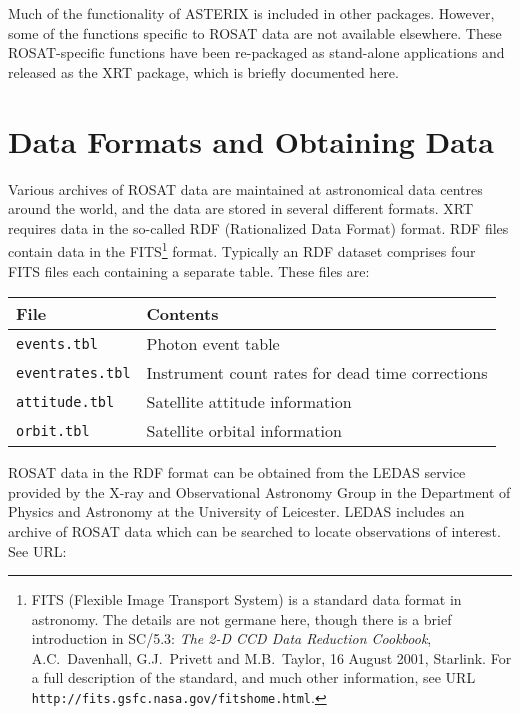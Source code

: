 \documentclass[twoside,11pt]{article}
\newcommand{\htmladdnormallink}[2]{#1}
\newcommand{\xref}[3]{#1}
\newcommand{\xlabel}[1]{}
\renewcommand{\_}{\texttt{\symbol{95}}}
\begin{document}
Much of the functionality of ASTERIX is included in other packages.
However, some of the functions specific to ROSAT data are not available
elsewhere.  These ROSAT-specific functions have been re-packaged as
stand-alone applications and released as the XRT package, which is briefly
documented here.


\section{\xlabel{FORMATS}\label{FORMATS}Data Formats and Obtaining Data}

Various archives of ROSAT data are maintained at astronomical data
centres around the world, and the data are stored in several different
formats.  XRT requires data in the so-called RDF (Rationalized Data 
Format) format.  RDF files contain data in the FITS\footnote{FITS (Flexible
Image Transport System) is a standard data format in astronomy.  The
details are not germane here, though there is a
\xref{brief introduction}{sc5}{FITS} in \xref{SC/5.3}{sc5}{}: {\it The
2-D CCD Data Reduction Cookbook}, A.C.~Davenhall, G.J.~Privett and
M.B.~Taylor, 16 August 2001, Starlink.  For a full description of the
standard, and much other information, see URL
\htmladdnormallink{{\tt http://fits.gsfc.nasa.gov/fits\_home.html}}
{http://fits.gsfc.nasa.gov/fits_home.html}.} format.  Typically an RDF
dataset comprises four FITS files each containing a separate table.  These
files are:

\begin{center}
\begin{tabular}{ll}
File                 & Contents \\ \hline
{\tt events.tbl}     & Photon event table \\
{\tt eventrates.tbl} & Instrument count rates for dead time corrections \\
{\tt attitude.tbl}   & Satellite attitude information  \\
{\tt orbit.tbl}      & Satellite orbital information   \\
\end{tabular}
\end{center}

ROSAT data in the RDF format can be obtained from the 
\htmladdnormallink{LEDAS}{http://ledas-www.star.le.ac.uk/}
service provided by the
\htmladdnormallink{X-ray and Observational Astronomy Group}
{http://www.star.le.ac.uk/}
in the Department of Physics and Astronomy at the University of Leicester.
LEDAS includes an archive of ROSAT data which can be searched to locate
observations of interest.  See URL:
\end{document}
